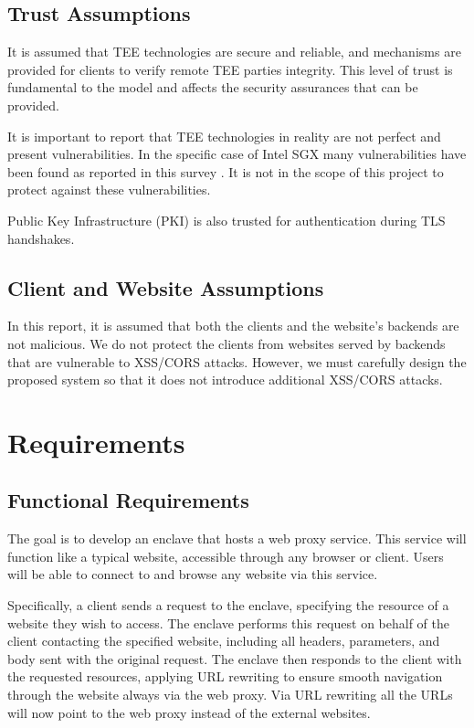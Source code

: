 \subsection{Trust Assumptions}

It is assumed that TEE technologies are secure and reliable, and mechanisms are provided for clients to verify remote TEE parties integrity. This level of trust is fundamental to the model and affects the security assurances that can be provided.

It is important to report that TEE technologies in reality are not perfect and present vulnerabilities. In the specific case of Intel SGX many vulnerabilities have been found as reported in this survey \cite{nilsson2020surveypublishedattacksintel}. It is not in the scope of this project to protect against these vulnerabilities.

Public Key Infrastructure (PKI) \cite{rfc5280} is also trusted for authentication during TLS handshakes.

\subsection{Client and Website Assumptions}

In this report, it is assumed that both the clients and the website's backends are not malicious. We do not protect the clients from websites served by backends that are vulnerable to XSS/CORS attacks. However, we must carefully design the proposed system so that it does not introduce additional XSS/CORS attacks.

\section{Requirements}
\subsection{Functional Requirements}
The goal is to develop an enclave that hosts a web proxy service. This service will function like a typical website, accessible through any browser or client. Users will be able to connect to and browse any website via this service. 

Specifically, a client sends a request to the enclave, specifying the resource of a website they wish to access. The enclave performs this request on behalf of the client contacting the specified website, including all headers, parameters, and body sent with the original request. The enclave then responds to the client with the requested resources, applying URL rewriting to ensure smooth navigation through the website always via the web proxy. Via URL rewriting all the URLs will now point to the web proxy instead of the external websites.

